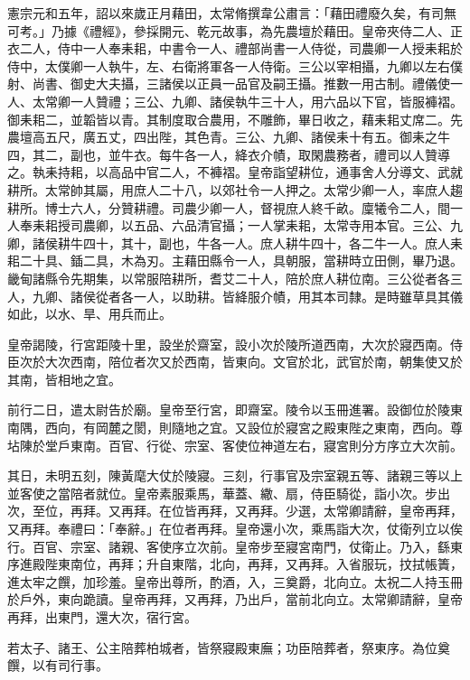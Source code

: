 \begin{pinyinscope}
 憲宗元和五年，詔以來歲正月藉田，太常脩撰韋公肅言：「藉田禮廢久矣，有司無可考。」乃據《禮經》，參採開元、乾元故事，為先農壇於藉田。皇帝夾侍二人、正衣二人，侍中一人奉耒耜，中書令一人、禮部尚書一人侍從，司農卿一人授耒耜於侍中，太僕卿一人執牛，左、右衛將軍各一人侍衛。三公以宰相攝，九卿以左右僕射、尚書、御史大夫攝，三諸侯以正員一品官及嗣王攝。推數一用古制。禮儀使一人、太常卿一人贊禮；三公、九卿、諸侯執牛三十人，用六品以下官，皆服褲褶。御耒耜二，並韜皆以青。其制度取合農用，不雕飾，畢日收之，藉耒耜丈席二。先農壇高五尺，廣五丈，四出陛，其色青。三公、九卿、諸侯耒十有五。御耒之牛四，其二，副也，並牛衣。每牛各一人，絳衣介幘，取閑農務者，禮司以人贊導之。執耒持耜，以高品中官二人，不褲褶。皇帝詣望耕位，通事舍人分導文、武就耕所。太常帥其屬，用庶人二十八，以郊社令一人押之。太常少卿一人，率庶人趨耕所。博士六人，分贊耕禮。司農少卿一人，督視庶人終千畝。廩犧令二人，間一人奉耒耜授司農卿，以五品、六品清官攝；一人掌耒耜，太常寺用本官。三公、九卿，諸侯耕牛四十，其十，副也，牛各一人。庶人耕牛四十，各二牛一人。庶人耒耜二十具、鍤二具，木為刃。主藉田縣令一人，具朝服，當耕時立田側，畢乃退。畿甸諸縣令先期集，以常服陪耕所，耆艾二十人，陪於庶人耕位南。三公從者各三人，九卿、諸侯從者各一人，以助耕。皆絳服介幘，用其本司隸。是時雖草具其儀如此，以水、旱、用兵而止。



 皇帝謁陵，行宮距陵十里，設坐於齋室，設小次於陵所道西南，大次於寢西南。侍臣次於大次西南，陪位者次又於西南，皆東向。文官於北，武官於南，朝集使又於其南，皆相地之宜。



 前行二日，遣太尉告於廟。皇帝至行宮，即齋室。陵令以玉冊進署。設御位於陵東南隅，西向，有岡麓之閡，則隨地之宜。又設位於寢宮之殿東陛之東南，西向。尊坫陳於堂戶東南。百官、行從、宗室、客使位神道左右，寢宮則分方序立大次前。



 其日，未明五刻，陳黃麾大仗於陵寢。三刻，行事官及宗室親五等、諸親三等以上並客使之當陪者就位。皇帝素服乘馬，華蓋、繖、扇，侍臣騎從，詣小次。步出次，至位，再拜。又再拜。在位皆再拜，又再拜。少選，太常卿請辭，皇帝再拜，又再拜。奉禮曰：「奉辭。」在位者再拜。皇帝還小次，乘馬詣大次，仗衛列立以俟行。百官、宗室、諸親、客使序立次前。皇帝步至寢宮南門，仗衛止。乃入，繇東序進殿陛東南位，再拜；升自東階，北向，再拜，又再拜。入省服玩，抆拭帳簀，進太牢之饌，加珍羞。皇帝出尊所，酌酒，入，三奠爵，北向立。太祝二人持玉冊於戶外，東向跪讀。皇帝再拜，又再拜，乃出戶，當前北向立。太常卿請辭，皇帝再拜，出東門，還大次，宿行宮。



 若太子、諸王、公主陪葬柏城者，皆祭寢殿東廡；功臣陪葬者，祭東序。為位奠饌，以有司行事。




\end{pinyinscope}

